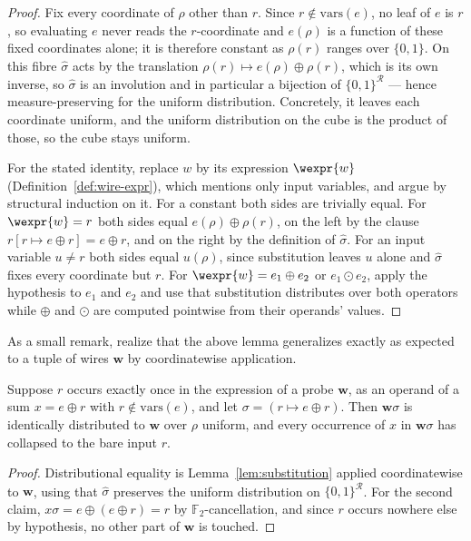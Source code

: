 \begin{proof}
Fix every coordinate of $\rho$ other than $r$. Since $r \notin \mathrm{vars}(e)$,
no leaf of $e$ is $r$, so evaluating $e$ never reads the $r$-coordinate and
$e(\rho)$ is a function of these fixed
coordinates alone; it is therefore constant as $\rho(r)$ ranges over $\{0,1\}$. On this
fibre $\widehat{\sigma}$ acts by the translation
$\rho(r) \mapsto e(\rho) \oplus \rho(r)$, which is its own inverse, so
$\widehat{\sigma}$ is an involution and in particular a bijection of
$\{0,1\}^{\mathcal{R}}$ --- hence measure-preserving for the uniform distribution.
Concretely, it leaves each coordinate uniform, and the uniform distribution on the
cube is the product of those, so the cube stays uniform.

For the stated identity, replace $w$ by its expression $\wexpr{w}$
(Definition~\ref{def:wire-expr}), which mentions only input variables, and argue
by structural induction on it. For a constant both sides are trivially equal. For
$\wexpr{w} = r$ both sides equal $e(\rho) \oplus \rho(r)$, on the left by the
clause $r[r \mapsto e \oplus r] = e \oplus r$, and on the right by the definition of
$\widehat{\sigma}$. For an input variable $u \neq r$ both sides equal $u(\rho)$,
since substitution leaves $u$ alone and $\widehat{\sigma}$ fixes every coordinate
but $r$. For $\wexpr{w} = e_1 \oplus e_2$ or $e_1 \odot e_2$, apply the hypothesis
to $e_1$ and $e_2$ and use that substitution distributes over both operators while
$\oplus$ and $\odot$ are computed pointwise from their operands' values.
\end{proof}

As a small remark, realize that the above lemma generalizes exactly as expected to a
tuple of wires $\mathbf{w}$ by coordinatewise application.

\begin{corollary}
\label{cor:single-occurrence-discharge}
Suppose $r$ occurs exactly once in the expression of a probe $\mathbf{w}$, as an
operand of a sum $x = e \oplus r$ with
$r \notin \mathrm{vars}(e)$, and let $\sigma = (r \mapsto e \oplus r)$. Then
$\mathbf{w}\sigma$ is identically distributed to $\mathbf{w}$ over $\rho$
uniform, and every occurrence of $x$ in $\mathbf{w}\sigma$ has collapsed to the
bare input $r$.
\end{corollary}

\begin{proof}
Distributional equality is Lemma~\ref{lem:substitution} applied coordinatewise
to $\mathbf{w}$, using that $\widehat{\sigma}$ preserves the uniform
distribution on $\{0,1\}^{\mathcal{R}}$. For the second claim,
$x\sigma = e \oplus (e \oplus r) = r$ by $\mathbb{F}_2$-cancellation, and since $r$
occurs nowhere else by hypothesis, no other part of $\mathbf{w}$ is touched.
\end{proof}

